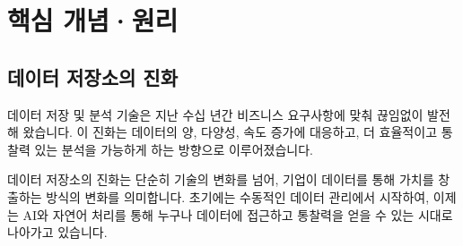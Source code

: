 \documentclass[11pt,a4paper]{article}
\theoremstyle{definition}
\begin{document}
\newpage
\section{핵심 개념·원리}

\subsection{데이터 저장소의 진화}
데이터 저장 및 분석 기술은 지난 수십 년간 비즈니스 요구사항에 맞춰 끊임없이 발전해 왔습니다. 이 진화는 데이터의 양, 다양성, 속도 증가에 대응하고, 더 효율적이고 통찰력 있는 분석을 가능하게 하는 방향으로 이루어졌습니다.

\begin{overviewbox}[title=데이터 저장소 진화의 여정]
데이터 저장소의 진화는 단순히 기술의 변화를 넘어, 기업이 데이터를 통해 가치를 창출하는 방식의 변화를 의미합니다. 초기에는 수동적인 데이터 관리에서 시작하여, 이제는 AI와 자연어 처리를 통해 누구나 데이터에 접근하고 통찰력을 얻을 수 있는 시대로 나아가고 있습니다.
\end{overviewbox}
\end{document}
